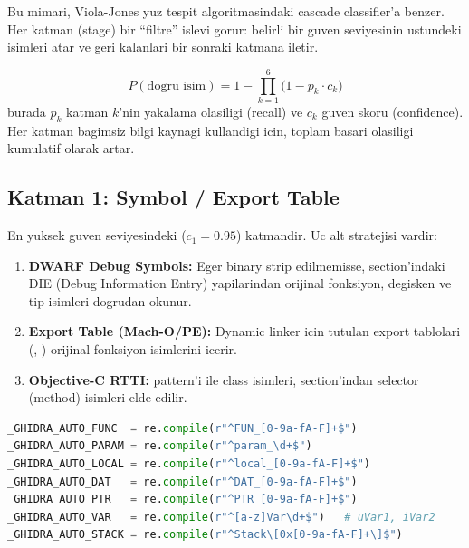 Bu mimari, Viola-Jones yuz tespit algoritmasindaki cascade classifier'a
benzer. Her katman (stage) bir ``filtre'' islevi gorur: belirli bir
guven seviyesinin ustundeki isimleri atar ve geri kalanlari bir sonraki
katmana iletir.

\begin{equation}
  P(\text{dogru isim}) = 1 - \prod_{k=1}^{6} \bigl(1 - p_k \cdot c_k\bigr)
  \label{eq:cascade-prob}
\end{equation}
burada $p_k$ katman $k$'nin yakalama olasiligi (recall) ve $c_k$ guven
skoru (confidence). Her katman bagimsiz bilgi kaynagi kullandigi icin,
toplam basari olasiligi kumulatif olarak artar.


\subsection{Katman 1: Symbol / Export Table}
\label{subsec:layer1-symbol}

En yuksek guven seviyesindeki ($c_1 = 0.95$) katmandir. Uc alt stratejisi vardir:

\begin{enumerate}
  \item \textbf{DWARF Debug Symbols:} Eger binary strip edilmemisse,
         section'indaki DIE (Debug Information Entry)
        yapilarindan orijinal fonksiyon, degisken ve tip isimleri dogrudan okunur.
  \item \textbf{Export Table (Mach-O/PE):} Dynamic linker icin tutulan export
        tablolari (, ) orijinal fonksiyon
        isimlerini icerir.
  \item \textbf{Objective-C RTTI:}  pattern'i
        ile class isimleri,  section'indan selector (method) isimleri
        elde edilir.
\end{enumerate}

\begin{lstlisting}[language=Python, caption={Ghidra otomatik isim tespiti regex pattern'leri (c\_namer.py)}, label={lst:ghidra-auto}]
_GHIDRA_AUTO_FUNC  = re.compile(r"^FUN_[0-9a-fA-F]+$")
_GHIDRA_AUTO_PARAM = re.compile(r"^param_\d+$")
_GHIDRA_AUTO_LOCAL = re.compile(r"^local_[0-9a-fA-F]+$")
_GHIDRA_AUTO_DAT   = re.compile(r"^DAT_[0-9a-fA-F]+$")
_GHIDRA_AUTO_PTR   = re.compile(r"^PTR_[0-9a-fA-F]+$")
_GHIDRA_AUTO_VAR   = re.compile(r"^[a-z]Var\d+$")   # uVar1, iVar2
_GHIDRA_AUTO_STACK = re.compile(r"^Stack\[0x[0-9a-fA-F]+\]$")
\end{lstlisting}

